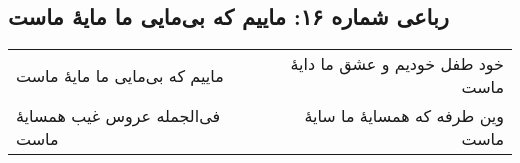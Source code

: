 \begin{center}
\section*{رباعی شماره ۱۶: ماییم که بی‌مایی ما مایهٔ ماست}
\label{sec:016}
\begin{longtable}{l p{0.5cm} r}
ماییم که بی‌مایی ما مایهٔ ماست
&&
خود طفل خودیم و عشق ما دایهٔ ماست
\\
فی‌الجمله عروس غیب همسایهٔ ماست
&&
وین طرفه که همسایهٔ ما سایهٔ ماست
\\
\end{longtable}
\end{center}
